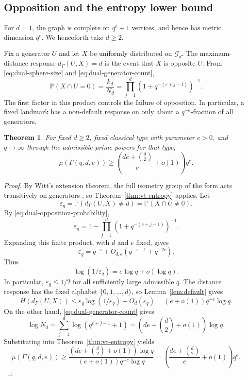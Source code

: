 \documentclass[11pt]{article}
\newtheorem{theorem}{Theorem}[section]
\theoremstyle{definition}
\theoremstyle{remark}
\newcommand{\Prob}{\mathbb P}
\newcommand{\eps}{\varepsilon}
\begin{document}
\subsection{Opposition and the entropy lower bound}

For $d=1$, the graph is complete on $q^e+1$ vertices, and hence has metric
dimension $q^e$.  We henceforth take $d\geq2$.

Fix a generator $U$ and let $X$ be uniformly distributed on $\mathcal 
G_d$.
The maximum-distance response $d_\Gamma(U,X)=d$ is the event that $X$ is
opposite $U$.  From \eqref{eq:dual-sphere-size} and
\eqref{eq:dual-generator-count},
\begin{equation}\label{eq:dual-opposition-probability}
        \Prob(X\cap U=0)
        =\frac{k_d}{N_d}
        =\prod_{j=1}^d(1+q^{-(e+j-1)})^{-1}.
\end{equation}
The first factor in this product controls the failure of opposition.  In
particular, a fixed landmark has a non-default response on only about a
$q^{-e}$-fraction of all generators.

\begin{theorem}\label{thm:dual-lower}
For fixed $d\geq2$, fixed classical type with parameter $e>0$, and
$q\to\infty$ through the admissible prime powers for that type,
\[
        \mu(\Gamma(q,d,e))
        \geq
        \left(\frac{de+\binom d2}{e}+o(1)\right)q^e.
\]
\end{theorem}

\begin{proof}
By Witt's extension theorem, the full isometry group of the form acts
transitively on generators \cite{TaylorClassicalGroups}, so
Theorem~\ref{thm:vt-entropy} applies.  Let
\[
        \eps_q=\Prob(d_\Gamma(U,X)\neq d)
        =\Prob(X\cap U\neq0).
\]
By \eqref{eq:dual-opposition-probability},
\[
        \eps_q
        =1-\prod_{j=1}^d(1+q^{-(e+j-1)})^{-1}.
\]
Expanding this finite product, with $d$ and $e$ fixed, gives
\begin{equation}\label{eq:dual-nonopposition-asymptotic}
        \eps_q
        =q^{-e}+O_{d,e}(q^{-e-1}+q^{-2e}).
\end{equation}
Thus
\[
        \log(1/\eps_q)=e\log q+o(\log q).
\]
In particular, $\eps_q\leq1/2$ for all sufficiently large admissible $q$.
The distance response has the fixed alphabet $\{0,1,\ldots,d\}$, so
Lemma~\ref{lem:default} gives
\[
        H(d_\Gamma(U,X))
        \leq
        \eps_q\log(1/\eps_q)+O_d(\eps_q)
        =(e+o(1))q^{-e}\log q.
\]
On the other hand, \eqref{eq:dual-generator-count} gives
\[
        \log N_d
        =\sum_{j=1}^d\log(q^{e+j-1}+1)
        =\left(de+\binom d2+o(1)\right)\log q.
\]
Substituting into Theorem~\ref{thm:vt-entropy} yields
\[
        \mu(\Gamma(q,d,e))
        \geq
        \frac{\left(de+\binom d2+o(1)\right)\log q}
        {(e+o(1))q^{-e}\log q}
        =
        \left(\frac{de+\binom d2}{e}+o(1)\right)q^e.
\]
\end{proof}
\end{document}
